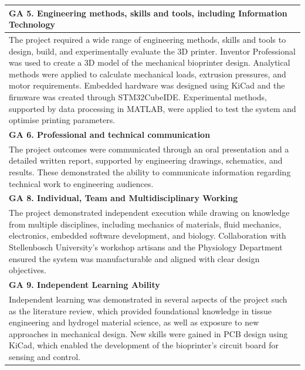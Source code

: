 \begin{center}
\begin{longtable}{|m{\textwidth}|}
\textbf{GA 5. Engineering methods, skills and tools, including Information Technology} \\
\hline    
The project required a wide range of engineering methods, skills and tools to design, build, and experimentally evaluate the 3D printer. Inventor Professional was used to create a 3D model of the mechanical bioprinter design. Analytical methods were applied to calculate mechanical loads, extrusion pressures, and motor requirements. Embedded hardware was designed using KiCad and the firmware was created through STM32CubeIDE. Experimental methods, supported by data processing in MATLAB, were applied to test the system and optimise printing parameters. \\
\hline    
    
\textbf{GA 6. Professional and technical communication} \\
\hline    
The project outcomes were communicated through an oral presentation and a detailed written report, supported by engineering drawings, schematics, and results. These demonstrated the ability to communicate information regarding technical work to engineering audiences. \\
\hline    

\textbf{GA 8. Individual, Team and Multidisciplinary Working} \\
\hline    
The project demonstrated independent execution while drawing on knowledge from multiple disciplines, including mechanics of materials, fluid mechanics, electronics, embedded software development, and biology. Collaboration with Stellenbosch University’s workshop artisans and the Physiology Department ensured the system was manufacturable and aligned with clear design objectives. \\
\hline    

\textbf{GA 9. Independent Learning Ability} \\
\hline    
Independent learning was demonstrated in several aspects of the project such as the literature review, which provided foundational knowledge in tissue engineering and hydrogel material science, as well as exposure to new approaches in mechanical design. New skills were gained in PCB design using KiCad, which enabled the development of the bioprinter's circuit board for sensing and control. \\
\hline    

\end{longtable}
\end{center}